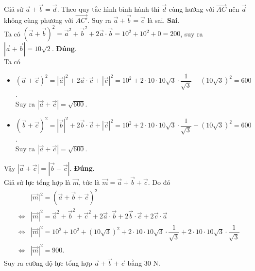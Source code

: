 \begin{ex}
{\begin{itemchoice}
Giả sử $\overrightarrow{a}+\overrightarrow{b}=\overrightarrow{d}$. Theo quy tắc hình bình hành thì $\overrightarrow{d}$ cùng hướng với $\overrightarrow{AC}$ nên $\overrightarrow{d}$ không cùng phương với $\overrightarrow{AC'}$. Suy ra $\overrightarrow{a}+\overrightarrow{b}=\overrightarrow{c}$ là sai.
 \itemch \textbf{Sai}.\\
Ta có $\left( \overrightarrow{a} + \overrightarrow{b}\right)^2 = {\overrightarrow{a}}^2 + {\overrightarrow{b}}^2 + 2\overrightarrow{a}\cdot \overrightarrow{b} = 10^2+10^2+0 =200$, suy ra $\left|\overrightarrow{a}+\overrightarrow{b}\right|=10\sqrt{2}$.
 \itemch \textbf{Đúng}.\\
Ta có \begin{itemize}
\item $\left(\overrightarrow{a}+\overrightarrow{c}\right)^2=\left|\overrightarrow{a}\right|^2+2\overrightarrow{a}\cdot\overrightarrow{c}+\left|\overrightarrow{c}\right|^2=10^2+2\cdot 10\cdot 10\sqrt{3}\cdot\dfrac{1}{\sqrt{3}}+\left(10\sqrt{3}\right)^2=600$.\\
Suy ra $\left|\overrightarrow{a}+\overrightarrow{c}\right|=\sqrt{600}$.
\item $\left(\overrightarrow{b}+\overrightarrow{c}\right)^2=\left|\overrightarrow{b}\right|^2+2\overrightarrow{b}\cdot\overrightarrow{c}+\left|\overrightarrow{c}\right|^2=10^2+2\cdot 10\cdot 10\sqrt{3}\cdot\dfrac{1}{\sqrt{3}}+\left(10\sqrt{3}\right)^2=600$.\\
Suy ra $\left|\overrightarrow{a}+\overrightarrow{c}\right|=\sqrt{600}$.
 \end{itemize}
Vậy $\left|\overrightarrow{a}+\overrightarrow{c}\right|=\left|\overrightarrow{b}+\overrightarrow{c}\right|$.
 \itemch \textbf{Đúng}.\\
Giả sử lực tổng hợp là $\overrightarrow{m}$, tức là $\overrightarrow{m}=\overrightarrow{a}+\overrightarrow{b}+\overrightarrow{c}$. Do đó
\begin{eqnarray*}
&& \big|\overrightarrow{m}\big|^2=\left(\overrightarrow{a}+\overrightarrow{b}+\overrightarrow{c}\right)^2\\
&\Leftrightarrow& \left|\overrightarrow{m}\right|^2={\overrightarrow{a}}^2+{\overrightarrow{b}}^2+{\overrightarrow{c}}^2+2\overrightarrow{a}\cdot\overrightarrow{b}+2\overrightarrow{b}\cdot\overrightarrow{c}+2\overrightarrow{c}\cdot\overrightarrow{a}\\
&\Leftrightarrow& \left|\overrightarrow{m}\right|^2=10^2+10^2+(10\sqrt{3})^2+2\cdot 10\cdot10\sqrt{3}\cdot\dfrac{1}{\sqrt{3}}+2\cdot 10\cdot10\sqrt{3}\cdot\dfrac{1}{\sqrt{3}}\\
&\Leftrightarrow& \left|\overrightarrow{m}\right|^2=900.
\end{eqnarray*}
Suy ra cường độ lực tổng hợp $\overrightarrow{a}+\overrightarrow{b}+\overrightarrow{c}$ bằng $30$ N.
\end{itemchoice}
}
\end{ex}

